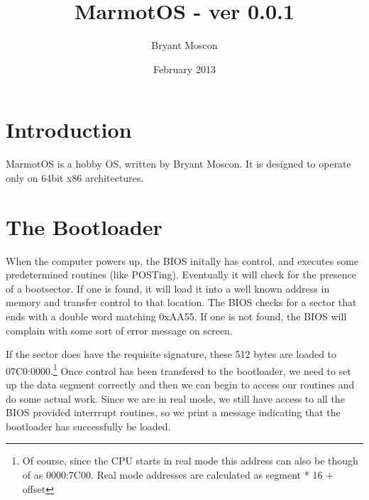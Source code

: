\documentclass[a4paper,12pt]{article}
\begin{document}
\title{MarmotOS - ver 0.0.1}
\author{Bryant Moscon}
\date{February 2013}
\maketitle
\thispagestyle{fancy}
\noindent\hrulefill
\vspace{-5mm} %
\tableofcontents
\noindent\hrulefill

\clearpage

\section{Introduction}

MarmotOS is a hobby OS, written by Bryant Moscon. It is designed to operate only on 64bit x86 architectures. 


\section{The Bootloader}

When the computer powers up, the BIOS initally has control, and executes some predetermined routines (like POSTing). Eventually it will check for the presence of a bootsector. If one is found, it will load it into a well known address in memory and transfer control to that location. The BIOS checks for a sector that ends with a double word matching 0xAA55. If one is not found, the BIOS will complain with some sort of error message on screen.

If the sector does have the requisite signature, these 512 bytes are loaded to 07C0:0000.\footnote{Of course, since the CPU starts in real mode this address can also be though of as 0000:7C00. Real mode addresses are calculated as segment * 16 + offset} Once control has been transfered to the bootloader, we need to set up the data segment correctly and then we can begin to access our routines and do some actual work. Since we are in real mode, we still have access to all the BIOS provided interrrupt routines, so we print a message indicating that the bootloader has successfully be loaded. 
\end{document}
